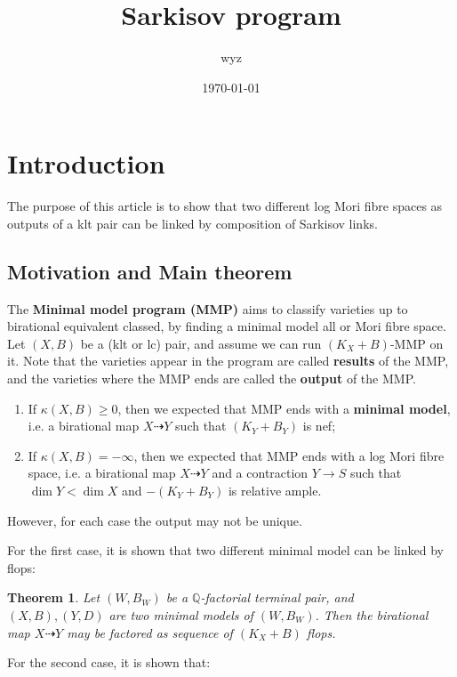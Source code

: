 \documentclass{article}
\title{Sarkisov program}
\author{wyz}
\date{\today}
\newtheorem{thm}[defn]{Theorem}
\begin{document}
  \maketitle
  \tableofcontents
\section{Introduction}

The purpose of this article is to show that two different log Mori fibre spaces as outputs of a klt pair can be linked by composition of  Sarkisov links.

\subsection{Motivation and Main theorem}
The \textbf{Minimal model program (MMP)}  aims to classify varieties up to birational equivalent classed, by finding a minimal model all or Mori fibre space. Let $ \left(X,B\right) $ be a (klt or lc) pair, and assume we can run $ (K_X+B)$-MMP on it. Note that the varieties appear in the program are called \textbf{results} of the MMP, and the varieties where the MMP ends are called the \textbf{output} of the MMP.
\begin{enumerate}
  \item If $\kappa(X,B)\geqslant 0$, then we expected that MMP ends with a \textbf{minimal model}, i.e. a birational map $X \dashrightarrow Y$ such that $(K_Y+B_Y)$ is nef;
  \item If $\kappa(X,B)= -\infty$, then we expected that MMP ends with a log Mori fibre space, i.e. a birational map $X \dashrightarrow Y$ and a contraction $Y\to S$ such that $\dim Y<\dim X$ and $-(K_Y+B_Y)$ is relative ample.
\end{enumerate}
However, for each case the output may not be unique.

For the first case, it is shown that two different minimal model can be linked by flops:
\begin{thm}
  \cite[Theorem 1]{kawamataFlopsConnectMinimal2008} Let $(W,B_W)$ be a $\mathbb{Q}$-factorial terminal pair, and $(X,B),(Y,D)$ are two minimal models of $(W,B_W)$. Then the birational map $X\dashrightarrow Y$ may be factored as sequence of $(K_X+B)$ flops. 
\end{thm}
For the second case, it is shown that:
\end{document}

